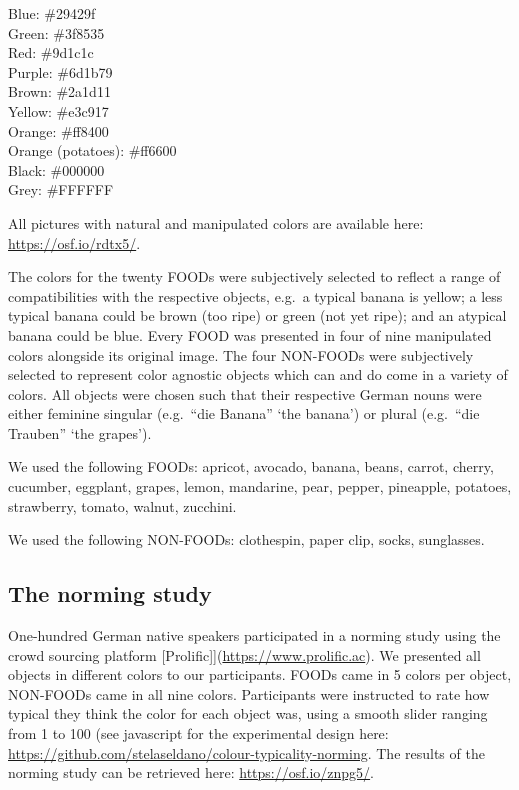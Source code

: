 \documentclass[
]{article}
\begin{document}
\noindent Blue: \#29429f\\
\noindent Green: \#3f8535\\
\noindent Red: \#9d1c1c\\
\noindent Purple: \#6d1b79\\
\noindent Brown: \#2a1d11\\
\noindent Yellow: \#e3c917\\
\noindent Orange: \#ff8400\\
\noindent Orange (potatoes): \#ff6600\\
\noindent Black: \#000000\\
\noindent Grey: \#FFFFFF

All pictures with natural and manipulated colors are available here:
\url{https://osf.io/rdtx5/}.

The colors for the twenty FOODs were subjectively selected to reflect a
range of compatibilities with the respective objects, e.g.~a typical
banana is yellow; a less typical banana could be brown (too ripe) or
green (not yet ripe); and an atypical banana could be blue. Every FOOD
was presented in four of nine manipulated colors alongside its original
image. The four NON-FOODs were subjectively selected to represent color
agnostic objects which can and do come in a variety of colors. All
objects were chosen such that their respective German nouns were either
feminine singular (e.g.~``die Banana'' `the banana') or plural
(e.g.~``die Trauben'' `the grapes').

We used the following FOODs: apricot, avocado, banana, beans, carrot,
cherry, cucumber, eggplant, grapes, lemon, mandarine, pear, pepper,
pineapple, potatoes, strawberry, tomato, walnut, zucchini.

We used the following NON-FOODs: clothespin, paper clip, socks,
sunglasses.

\hypertarget{the-norming-study}{%
\subsection{The norming study}\label{the-norming-study}}

One-hundred German native speakers participated in a norming study using
the crowd sourcing platform
{[}Prolific{]}{]}(\url{https://www.prolific.ac}). We presented all
objects in different colors to our participants. FOODs came in 5 colors
per object, NON-FOODs came in all nine colors. Participants were
instructed to rate how typical they think the color for each object was,
using a smooth slider ranging from 1 to 100 (see javascript for the
experimental design here:
\url{https://github.com/stelaseldano/colour-typicality-norming}. The
results of the norming study can be retrieved here:
\url{https://osf.io/znpg5/}.
\end{document}
